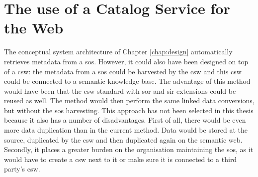 \section{The use of a Catalog Service for the Web}
\label{useCSW}
The conceptual system architecture of Chapter \ref{chap:design} automatically retrieves metadata from a \ac{sos}. However, it could also have been designed on top of a \ac{csw}: the metadata from a \ac{sos} could be harvested by the \ac{csw} and this \ac{csw} could be connected to a semantic knowledge base. The advantage of this method would have been that the \ac{csw} standard with \ac{sor} and \ac{sir} extensions could be reused as well. The method would then perform the same linked data conversions, but without the \ac{sos} harvesting. This approach has not been selected in this thesis because it also has a number of disadvantages. First of all, there would be even more data duplication than in the current method. Data would be stored at the source, duplicated by the \ac{csw} and then duplicated again on the semantic web. Secondly, it places a greater burden on the organisation maintaining the \ac{sos}, as it would have to create a \ac{csw} next to it or make sure it is connected to a third party's \ac{csw}.  